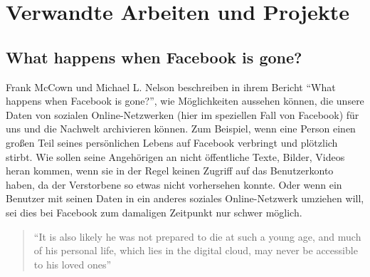 

\section{Verwandte Arbeiten und Projekte} %
\label{sec:verwandte_arbeiten_und_projekte}


\subsection{What happens when Facebook is gone?} %
\label{sub:what_happens_when_facebook_is_gone}

Frank McCown und Michael L. Nelson beschreiben in ihrem Bericht \enquote{What happens when Facebook is gone?}\cite{McCown2009}, wie Möglichkeiten aussehen können, die unsere Daten von sozialen Online-Netzwerken (hier im speziellen Fall von Facebook) für uns und die Nachwelt archivieren können. Zum Beispiel, wenn eine Person einen großen Teil seines persönlichen Lebens auf Facebook verbringt und plötzlich stirbt. Wie sollen seine Angehörigen an nicht öffentliche Texte, Bilder, Videos heran kommen, wenn sie in der Regel keinen Zugriff auf das Benutzerkonto haben, da der Verstorbene so etwas nicht vorhersehen konnte. Oder wenn ein Benutzer mit seinen Daten in ein anderes soziales Online-Netzwerk umziehen will, sei dies bei Facebook zum damaligen Zeitpunkt nur schwer möglich.

\begin{quote}
    \enquote{It is also likely he was not prepared to die at such a young age, and much of his personal life, which lies in the digital \grqq cloud\grqq, may never be accessible to his loved ones}
    \cite[S.\,251]{McCown2009}
\end{quote}

